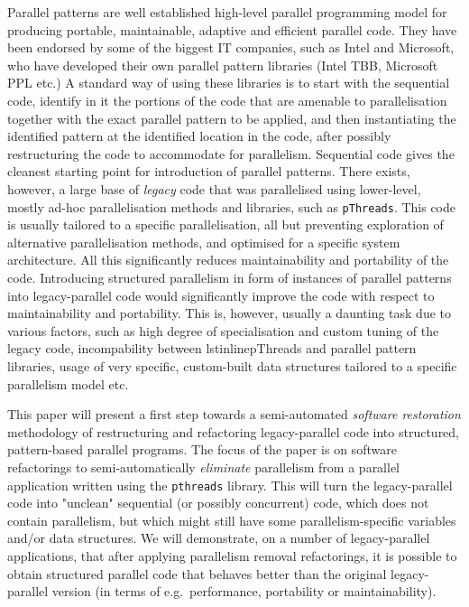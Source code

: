\documentclass{llncs}
\begin{document}
Parallel patterns are well established high-level parallel programming model for producing portable, maintainable, adaptive and efficient parallel code. They have been endorsed by some of the biggest IT companies, such as Intel and Microsoft, who have developed their own parallel pattern libraries (Intel TBB, Microsoft PPL etc.) A standard way of using these libraries is to start with the sequential code, identify in it the portions of the code that are amenable to parallelisation together with the exact parallel pattern to be applied, and then instantiating the identified pattern at the identified location in the code, after possibly restructuring the code to accommodate for parallelism. Sequential code gives the cleanest starting point for introduction of parallel patterns. There exists, however, a large base of \emph{legacy} code that was parallelised using lower-level, mostly ad-hoc parallelisation methods and libraries, such as \lstinline{pThreads}. This code is usually tailored to a specific parallelisation, all but preventing exploration of alternative parallelisation methods, and optimised for a specific system architecture. All this significantly reduces maintainability and portability of the code. %
Introducing structured parallelism in form of instances of parallel patterns into legacy-parallel code would significantly improve the code with respect to maintainability and portability. This is, however, usually a daunting task due to various factors, such as high degree of specialisation and custom tuning of the legacy code, incompability between lstinline{pThreads} and parallel pattern libraries, usage of very specific, custom-built data structures tailored to a specific parallelism model etc.
  
This paper will present a first step towards a semi-automated \emph{software restoration} methodology of restructuring and refactoring legacy-parallel code into structured, pattern-based parallel programs. The focus of the paper is on software refactorings to semi-automatically \emph{eliminate} parallelism from a parallel application written using the \lstinline{pthreads} library. This will turn the legacy-parallel code into "unclean" sequential (or possibly concurrent) code, which does not contain parallelism, but which might still have some parallelism-specific variables and/or data structures. We will demonstrate, on a number of legacy-parallel applications, that after applying parallelism removal refactorings, it is possible to obtain structured parallel code that behaves better than the original legacy-parallel version (in terms of e.g.~performance, portability or maintainability).
\end{document}
